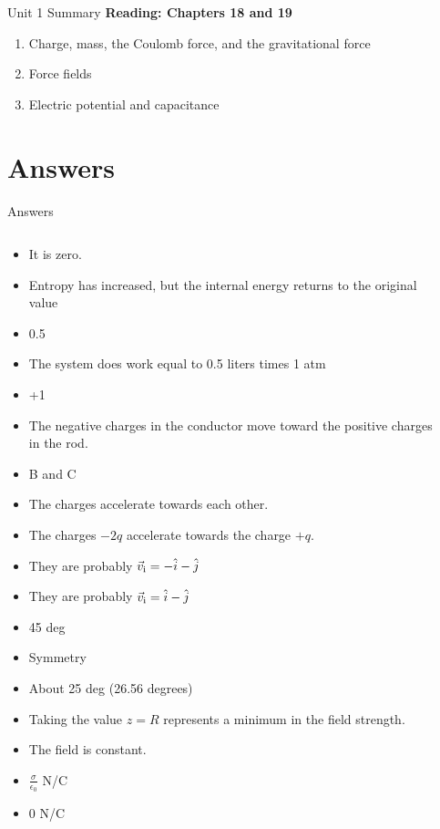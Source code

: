 \documentclass{beamer}
\begin{document}
\begin{frame}{Unit 1 Summary}
\textbf{Reading: Chapters 18 and 19}
\begin{enumerate}
\item Charge, mass, the Coulomb force, and the gravitational force
\item Force fields
\item Electric potential and capacitance
\end{enumerate}
\end{frame}

\section{Answers}

\begin{frame}{Answers}
\tiny
\begin{columns}[T]
\begin{column}{0.5\textwidth}
\begin{itemize}
\item It is zero.
\item Entropy has increased, but the internal energy returns to the original value
\item 0.5
\item The system does work equal to 0.5 liters times 1 atm
\item +1
\item The negative charges in the conductor move toward the positive charges in the rod.
\item B and C
\item The charges accelerate towards each other.
\item The charges $-2q$ accelerate towards the charge $+q$.
\item They are probably $\vec{v}_{\rm i} = -\hat{i}-\hat{j}$
\item They are probably $\vec{v}_{\rm i} = \hat{i}-\hat{j}$
\item 45 deg
\item Symmetry
\item About 25 deg (26.56 degrees)
\item Taking the value $z = R$ represents a minimum in the field strength.
\item The field is constant.
\item $\frac{\sigma}{\epsilon_0}$ N/C
\item 0 N/C
\end{itemize}
\end{column}
\begin{column}{0.5\textwidth}

\end{column}
\end{columns}
\end{frame}
\end{document}
